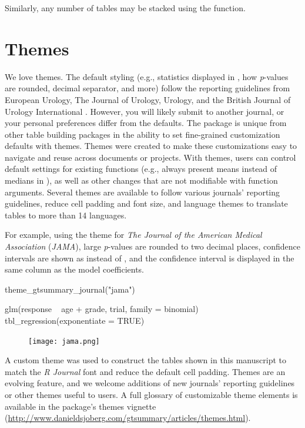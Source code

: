 Similarly, any number of  tables may be stacked using the  function.

\section{Themes}

We love themes.
The default styling (e.g., statistics displayed in , how \emph{p}-values are rounded, decimal separator, and more) follow the reporting guidelines from European Urology, The Journal of Urology, Urology, and the British Journal of Urology International \citep{assel2019guidelines}.
However, you will likely submit to another journal, or your personal preferences differ from the defaults.
The  package is unique from other table building packages in the ability to set fine-grained customization defaults with themes.
Themes were created to make these customizations easy to navigate and reuse across documents or projects.
With themes, users can control default settings for existing functions (e.g., always present means instead of medians in ), as well as other changes that are not modifiable with function arguments.
Several themes are available to follow various journals' reporting guidelines, reduce cell padding and font size, and language themes to translate  tables to more than 14 languages.

For example, using the theme for \textit{The Journal of the American Medical Association} (\textit{JAMA}), large \emph{p}-values are rounded to two decimal places, confidence intervals are shown as  instead of , and the confidence interval is displayed in the same column as the model coefficients.

\begin{example}
theme_gtsummary_journal("jama")

glm(response ~ age + grade, trial, family = binomial) %
  tbl_regression(exponentiate = TRUE)
\end{example}

\begin{figure}[h!]
  \texttt{[image: jama.png]}
  \centering
\end{figure}

A custom theme was used to construct the  tables shown in this manuscript to match the \emph{R Journal} font and reduce the default cell padding.
Themes are an evolving feature, and we welcome additions of new journals' reporting guidelines or other themes useful to users.
A full glossary of customizable theme elements is available in the package's themes vignette (\url{http://www.danieldsjoberg.com/gtsummary/articles/themes.html}).


